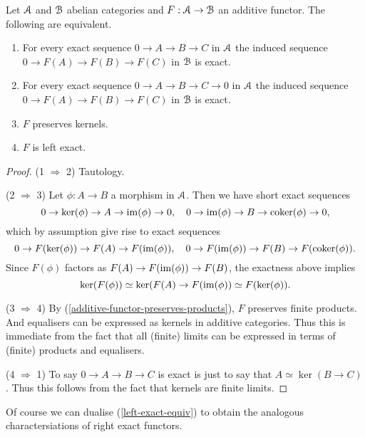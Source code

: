\begin{lemma}
  \label{left-exact-equiv}
  Let $\mathcal{A}$ and $\mathcal{B}$ abelian categories and $F : \mathcal{A} \to \mathcal{B}$ an additive
  functor. The following are equivalent.
  \begin{enumerate}
  \item For every exact sequence $0 \to A \to B \to C$ in $\mathcal{A}$ the
    induced sequence $0 \to F(A) \to F(B) \to F(C)$ in $\mathcal{B}$ is exact.
  \item For every exact sequence $0 \to A \to B \to C \to 0$ in $\mathcal{A}$
    the induced sequence $0 \to F(A) \to F(B) \to F(C)$ in $\mathcal{B}$ is
    exact.
  \item $F$ preserves kernels.
  \item $F$ is left exact.
  \end{enumerate}
\end{lemma}

\begin{proof}
  (1 $\Rightarrow$ 2) Tautology.

  \medskip
  (2 $\Rightarrow$ 3) Let $\phi : A \to B$ a morphism in $\mathcal{A}$. Then we
  have short exact sequences
  \[
  0 \to \operatorname{ker}(\phi) \to A \to \operatorname{im}(\phi) \to 0, \quad 0 \to \operatorname{im}(\phi)
  \to B \to \operatorname{coker}(\phi) \to 0,
  \]
  which by assumption give rise to exact sequences
  \[
  0 \to F(\operatorname{ker}(\phi)) \to F(A) \to F(\operatorname{im}(\phi)), \quad 0 \to
  F(\operatorname{im}(\phi)) \to F(B) \to F(\operatorname{coker}(\phi)).
  \]
  Since $F(\phi)$ factors as $F(A) \to F(\operatorname{im}(\phi)) \to F(B)$, the
  exactness above implies
  \[
  \operatorname{ker}(F(\phi)) \simeq \operatorname{ker}(F(A) \to F(\operatorname{im}(\phi)) \simeq
  F(\operatorname{ker}(\phi)).
  \]

  \medskip
  (3 $\Rightarrow$ 4) By (\ref{additive-functor-preserves-products}),
  $F$ preserves finite products. And equalisers can be expressed as
  kernels in additive categories. Thus this is immediate from the fact
  that all (finite) limits can be expressed in terms of (finite)
  products and equalisers.

  \medskip
  (4 $\Rightarrow$ 1) To say $0 \to A \to B \to C$ is exact is just to
  say that $A \simeq \ker(B \to C)$. Thus this follows from the fact
  that kernels are finite limits.
\end{proof}

Of course we can dualise (\ref{left-exact-equiv}) to obtain the
analogous charactersiations of right exact functors.


\nocite{weibel, stacks}




